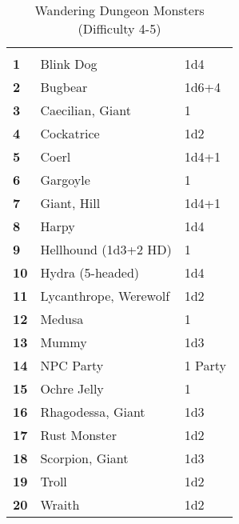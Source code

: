 \begin{multicols*}{2}
\begin {table}[H]
  \caption{Wandering Dungeon Monsters (Difficulty 4-5)}
  \begin{tabularx}{\columnwidth}{>{\bfseries}YYY}
   &  & \\
	1 & Blink Dog & 1d4\\
	2 & Bugbear & 1d6+4\\
	3 & Caecilian, Giant & 1\\
	4 & Cockatrice & 1d2\\
	5 & Coerl & 1d4+1\\
	6 & Gargoyle & 1\\
	7 & Giant, Hill & 1d4+1\\
	8 & Harpy & 1d4\\
	9 & Hellhound (1d3+2 HD) & 1\\
	10 & Hydra (5-headed) & 1d4\\
	11 & Lycanthrope, Werewolf & 1d2\\
	12 & Medusa & 1\\
	13 & Mummy & 1d3\\
	14 & NPC Party & 1 Party\\
	15 & Ochre Jelly & 1\\
	16 & Rhagodessa, Giant & 1d3\\
	17 & Rust Monster & 1d2\\
	18 & Scorpion, Giant & 1d3\\
	19 & Troll & 1d2\\
	20 & Wraith & 1d2
  \end {tabularx}
\end {table}


\end{multicols*}
